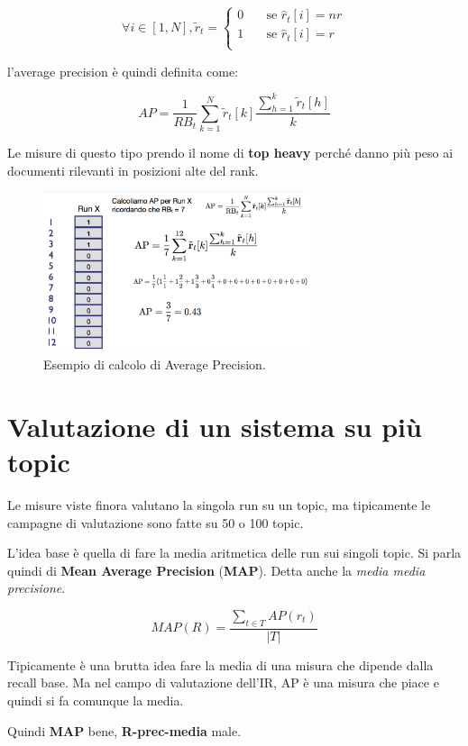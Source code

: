 $$
\forall i \in [1, N], \tilde{r}_t = \begin{cases}
0 \quad &\text{se } \hat{r}_t[i] = nr \\
1 \quad &\text{se } \hat{r}_t[i] = r \\
\end{cases}
$$

l'average precision è quindi definita come:

$$
AP = \frac{1}{RB_t}\sum\limits_{k=1}^{N}\tilde{r}_t[k]\frac{\sum\limits_{h=1}^{k} \tilde{r}_t[h]}{k}
$$

Le misure di questo tipo prendo il nome di \textbf{top heavy} perché danno più peso ai documenti rilevanti in posizioni alte del rank.

\begin{figure}[htbp]
	\centering
	\includegraphics[width=0.7\textwidth]{images/l15-fig-7.png}
	\caption{Esempio di calcolo di Average Precision.}
\end{figure}

\section{Valutazione di un sistema su più topic}

Le misure viste finora valutano la singola run su un topic, ma tipicamente le campagne di valutazione sono fatte su 50 o 100 topic.

L'idea base è quella di fare la media aritmetica delle run sui singoli topic. Si parla quindi di \textbf{Mean Average Precision} (\textbf{MAP}). Detta anche la \textit{media media precisione}.

$$
MAP(R) = \frac{\sum_{t\in T}AP(r_t)}{|T|}
$$

Tipicamente è una brutta idea fare la media di una misura che dipende dalla recall base. Ma nel campo di valutazione dell'IR, AP è una misura che piace e quindi si fa comunque la media. 

Quindi \textbf{MAP} bene, \textbf{R-prec-media} male.
